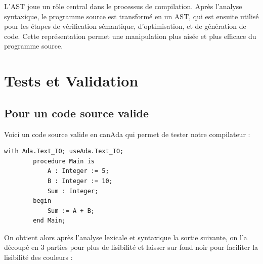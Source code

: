 \documentclass[french,a4paper]{article}
\begin{document}
    L'AST joue un rôle central dans le processus de compilation.
    Après l'analyse syntaxique, le programme source est transformé en un AST, qui est ensuite utilisé pour les étapes de vérification sémantique, d'optimisation, et de génération de code.
    Cette représentation permet une manipulation plus aisée et plus efficace du programme source.

    \section{Tests et Validation}\label{sec:tests-et-validation}

    \subsection{Pour un code source valide}\label{subsec:pour-un-code-source-valide}

    Voici un code source valide en canAda qui permet de tester notre compilateur :

    \begin{lstlisting}[label={lst:lstlisting16}]
        with Ada.Text_IO; useAda.Text_IO;
        procedure Main is
            A : Integer := 5;
            B : Integer := 10;
            Sum : Integer;
        begin
            Sum := A + B;
        end Main;
    \end{lstlisting}

    On obtient alors après l'analyse lexicale et syntaxique la sortie suivante, on l'a découpé en 3 parties pour plus de lisibilité et laisser sur fond noir pour faciliter la lisibilité des couleurs :
\end{document}
